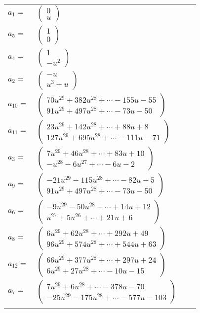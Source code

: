 \documentclass[1p]{elsarticle_modified}
\theoremstyle{definition}
\begin{document}
\begin{tabular}{m{7pt} m{180pt} m{7pt} m{180pt} }
\flushright $a_{1}=$&$\begin{pmatrix}0\\u\end{pmatrix}$ \\
\flushright $a_{5}=$&$\begin{pmatrix}1\\0\end{pmatrix}$ \\
\flushright $a_{4}=$&$\begin{pmatrix}1\\- u^2\end{pmatrix}$ \\
\flushright $a_{2}=$&$\begin{pmatrix}- u\\u^3+u\end{pmatrix}$ \\
\flushright $a_{10}=$&$\begin{pmatrix}70 u^{29}+382 u^{28}+\cdots-155 u-55\\91 u^{29}+497 u^{28}+\cdots-73 u-50\end{pmatrix}$ \\
\flushright $a_{11}=$&$\begin{pmatrix}23 u^{29}+142 u^{28}+\cdots+88 u+8\\127 u^{29}+695 u^{28}+\cdots-111 u-71\end{pmatrix}$ \\
\flushright $a_{3}=$&$\begin{pmatrix}7 u^{29}+46 u^{28}+\cdots+83 u+10\\- u^{28}-6 u^{27}+\cdots-6 u-2\end{pmatrix}$ \\
\flushright $a_{9}=$&$\begin{pmatrix}-21 u^{29}-115 u^{28}+\cdots-82 u-5\\91 u^{29}+497 u^{28}+\cdots-73 u-50\end{pmatrix}$ \\
\flushright $a_{6}=$&$\begin{pmatrix}-9 u^{29}-50 u^{28}+\cdots+14 u+12\\u^{27}+5 u^{26}+\cdots+21 u+6\end{pmatrix}$ \\
\flushright $a_{8}=$&$\begin{pmatrix}6 u^{29}+62 u^{28}+\cdots+292 u+49\\96 u^{29}+574 u^{28}+\cdots+544 u+63\end{pmatrix}$ \\
\flushright $a_{12}=$&$\begin{pmatrix}66 u^{29}+377 u^{28}+\cdots+297 u+24\\6 u^{29}+27 u^{28}+\cdots-10 u-15\end{pmatrix}$ \\
\flushright $a_{7}=$&$\begin{pmatrix}7 u^{29}+6 u^{28}+\cdots-378 u-70\\-25 u^{29}-175 u^{28}+\cdots-577 u-103\end{pmatrix}$\\&\end{tabular}
\end{document}
